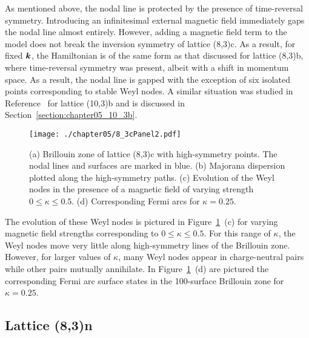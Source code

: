 As mentioned above, the nodal line is protected by the presence of time-reversal symmetry.
Introducing an infinitesimal external magnetic field immediately gaps the nodal line almost entirely.
However, adding a magnetic field term to the model does not break the inversion symmetry of lattice (8,3)c.
As a result, for fixed $\bm{k}$, the Hamiltonian is of the same form as that discussed for lattice (8,3)b, where time-reversal symmetry was present, albeit with a shift in momentum space.
As a result, the nodal line is gapped with the exception of six isolated points corresponding to stable Weyl nodes.
A similar situation was studied in Reference~\cite{HermannsPRL2015} for lattice (10,3)b and is discussed in Section~\ref{section:chapter05_10_3b}.
%
\begin{figure}[tb]
	\centering
	\texttt{[image: ./chapter05/8\_3cPanel2.pdf]}
	\caption{
		(a) Brillouin zone of lattice (8,3)c with high-symmetry points.
		The nodal lines and surfaces are marked in blue.
		(b) Majorana dispersion plotted along the high-symmetry paths.
		(c) Evolution of the Weyl nodes in the presence of a magnetic field of varying strength $0 \leq \kappa \leq 0.5$.
		(d) Corresponding Fermi arcs for $\kappa = 0.25$.
	}
	\label{fig:chapter05_8_3cPanel2}
\end{figure}
%

The evolution of these Weyl nodes is pictured in Figure~\ref{fig:chapter05_8_3cPanel2}~(c) for varying magnetic field strengths corresponding to $0 \leq \kappa \leq 0.5$.
For this range of $\kappa$, the Weyl nodes move very little along high-symmetry lines of the Brillouin zone.
However, for larger values of $\kappa$, many Weyl nodes appear in charge-neutral pairs while other pairs mutually annihilate.
In Figure~\ref{fig:chapter05_8_3cPanel2}~(d) are pictured the corresponding Fermi arc surface states in the 100-surface Brillouin zone for $\kappa = 0.25$.


%
%
\subsection{Lattice (8,3)n}
\label{section:chapter05_8_3n}
%
%

